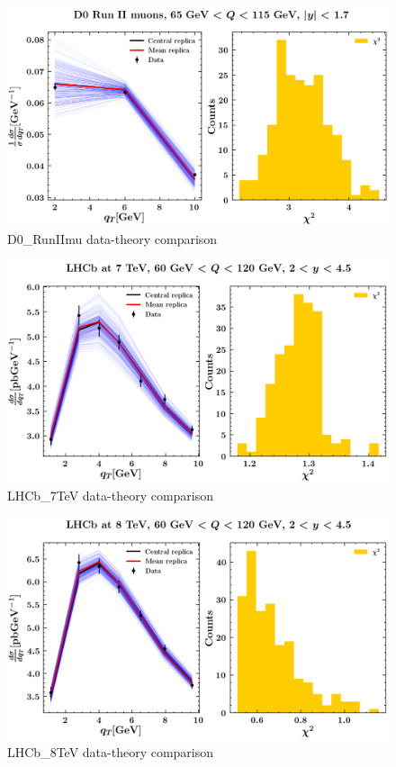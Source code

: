 \documentclass[
]{article}
\begin{document}
\begin{figure}
\centering
\includegraphics{pngplots/D0_RunIImu.png}
\caption{D0\_RunIImu data-theory comparison}
\end{figure}

\begin{figure}
\centering
\includegraphics{pngplots/LHCb_7TeV.png}
\caption{LHCb\_7TeV data-theory comparison}
\end{figure}

\begin{figure}
\centering
\includegraphics{pngplots/LHCb_8TeV.png}
\caption{LHCb\_8TeV data-theory comparison}
\end{figure}
\end{document}
